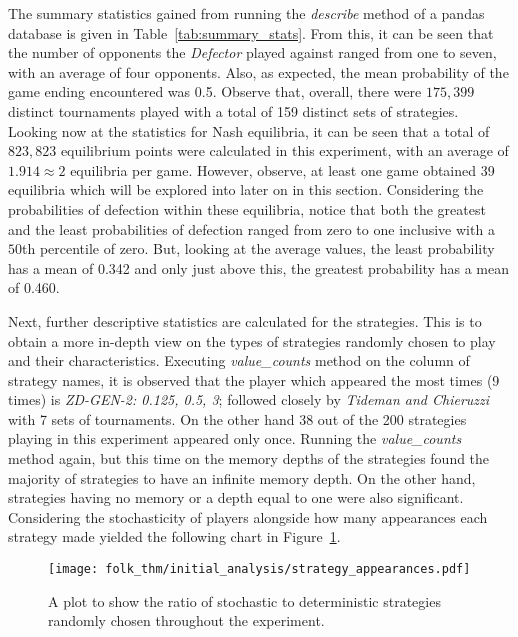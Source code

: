 The summary statistics gained from running the \textit{describe} method of a
pandas database is given in Table~\ref{tab:summary_stats}. From this, it can be
seen that the number of opponents the \textit{Defector} played against ranged
from one to seven, with an average of four opponents. Also, as expected, the
mean probability of the game ending encountered was 0.5. Observe that, overall,
there were \(175,399\) distinct tournaments played with a total of 159 distinct sets of strategies. 
Looking now at the statistics for Nash equilibria, it can be seen that a total
of \(823,823\) equilibrium points were calculated in this experiment, with an
average of \(1.914 \approx 2\) equilibria per game. However, observe, at least
one game obtained 39 equilibria which will be explored into later on in this
section. Considering the probabilities of defection within these equilibria,
notice that both the greatest and the least probabilities of defection ranged
from zero to one inclusive with a \(50\)th percentile of zero. But, looking at
the average values, the least probability has a mean of 0.342 and only just
above this, the greatest probability has a mean of 0.460.

Next, further descriptive statistics are calculated for the strategies. This is
to obtain a more in-depth view on the types of strategies randomly chosen to
play and their characteristics. Executing \textit{value\_counts} method on the
column of strategy names, it is observed that the player which appeared the most
times (9 times) is \textit{ZD-GEN-2: 0.125, 0.5, 3}; followed closely by
\textit{Tideman and Chieruzzi} with 7 sets of tournaments. On the other hand 38
out of the 200 strategies playing in this experiment appeared only once.
Running the \textit{value\_counts} method again, but this time on the memory
depths of the strategies found the majority of strategies to have an infinite
memory depth. On the other hand, strategies having no memory or a depth equal to
one were also significant. Considering the stochasticity of players alongside
how many appearances each strategy made yielded the following chart in
Figure~\ref{fig:stochastic_chart}.

\begin{figure}
    \centering
    \texttt{[image: folk\_thm/initial\_analysis/strategy\_appearances.pdf]}
    \caption{A plot to show the ratio of stochastic to deterministic strategies randomly chosen throughout the experiment.}\label{fig:stochastic_chart}
\end{figure}

